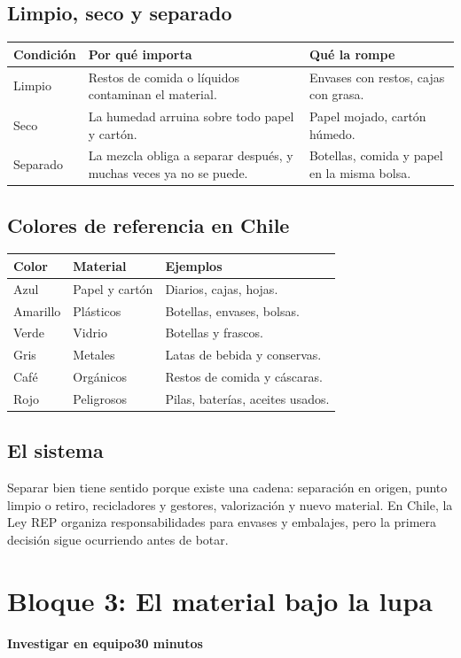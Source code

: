 \documentclass[10pt,a4paper]{article}
\newcommand{\blocktitle}[2]{%
  \vspace{2mm}
  {\large\bfseries\color{AIEPNavy}#1}\hfill{\small\bfseries\textcolor{AIEPRed}{#2}}\par
  \vspace{1mm}
}
\begin{document}
\subsection{Limpio, seco y separado}
\begin{tabularx}{\textwidth}{@{}p{24mm}Y Y@{}}
\textbf{\color{AIEPNavy}Condición} & \textbf{\color{AIEPNavy}Por qué importa} & \textbf{\color{AIEPNavy}Qué la rompe} \\
\hline
Limpio & Restos de comida o líquidos contaminan el material. & Envases con restos, cajas con grasa. \\
Seco & La humedad arruina sobre todo papel y cartón. & Papel mojado, cartón húmedo. \\
Separado & La mezcla obliga a separar después, y muchas veces ya no se puede. & Botellas, comida y papel en la misma bolsa. \\
\end{tabularx}

\subsection{Colores de referencia en Chile}
\begin{tabularx}{\textwidth}{@{}p{26mm}p{32mm}Y@{}}
\textbf{\color{AIEPNavy}Color} & \textbf{\color{AIEPNavy}Material} & \textbf{\color{AIEPNavy}Ejemplos} \\
\hline
Azul & Papel y cartón & Diarios, cajas, hojas. \\
Amarillo & Plásticos & Botellas, envases, bolsas. \\
Verde & Vidrio & Botellas y frascos. \\
Gris & Metales & Latas de bebida y conservas. \\
Café & Orgánicos & Restos de comida y cáscaras. \\
Rojo & Peligrosos & Pilas, baterías, aceites usados. \\
\end{tabularx}

\subsection{El sistema}
Separar bien tiene sentido porque existe una cadena: separación en origen, punto limpio o retiro, recicladores y gestores, valorización y nuevo material. En Chile, la Ley REP organiza responsabilidades para envases y embalajes, pero la primera decisión sigue ocurriendo antes de botar.

\newpage
\section{Bloque 3: El material bajo la lupa}
\blocktitle{Investigar en equipo}{30 minutos}
\end{document}

